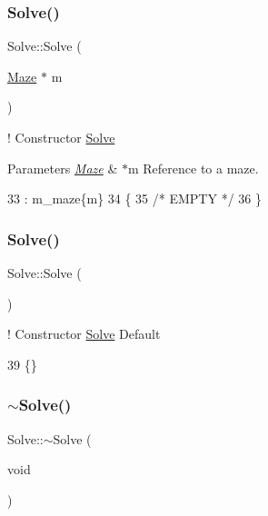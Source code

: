 \subsubsection{\texorpdfstring{Solve()}{Solve()}\hspace{0.1cm}{\footnotesize\ttfamily [1/3]}}
{\footnotesize\ttfamily Solve\+::\+Solve (\begin{DoxyParamCaption}\item[{\hyperlink{classMaze}{Maze} $\ast$}]{m }\end{DoxyParamCaption})\hspace{0.3cm}{\ttfamily [inline]}}



! Constructor \hyperlink{classSolve}{Solve} 


\begin{DoxyParams}{Parameters}
{\em \hyperlink{classMaze}{Maze}} & $\ast$m Reference to a maze. \\
\hline
\end{DoxyParams}

\begin{DoxyCode}
33                        : m\_maze\{m\} 
34         \{
35             \textcolor{comment}{/* EMPTY */}
36         \}
\end{DoxyCode}
\mbox{\label{classSolve_ac437f1307c9d4669205ac7d370a55ffc}} 
\subsubsection{\texorpdfstring{Solve()}{Solve()}\hspace{0.1cm}{\footnotesize\ttfamily [2/3]}}
{\footnotesize\ttfamily Solve\+::\+Solve (\begin{DoxyParamCaption}{ }\end{DoxyParamCaption})\hspace{0.3cm}{\ttfamily [inline]}}



! Constructor \hyperlink{classSolve}{Solve} Default 


\begin{DoxyCode}
39 \{\}
\end{DoxyCode}
\mbox{\label{classSolve_a3435d6ff721c2d8bebf0eff2411fa93e}} 
\subsubsection{\texorpdfstring{$\sim$\+Solve()}{~Solve()}}
{\footnotesize\ttfamily Solve\+::$\sim$\+Solve (\begin{DoxyParamCaption}\item[{void}]{ }\end{DoxyParamCaption})\hspace{0.3cm}{\ttfamily [inline]}}



